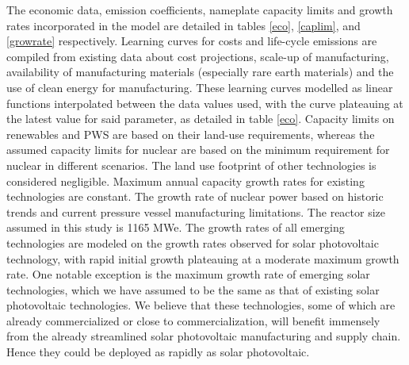 The economic data, emission coefficients, nameplate capacity limits and growth rates incorporated in the model are detailed in tables \ref{eco}, \ref{caplim}, and \ref{growrate} respectively. Learning curves for costs and life-cycle emissions are compiled from existing data about cost projections, scale-up of manufacturing, availability of manufacturing materials (especially rare earth materials) and the use of clean energy for manufacturing. These learning curves modelled as linear functions interpolated between the data values used, with the curve plateauing at the latest value for said parameter, as detailed in table \ref{eco}. Capacity limits on renewables and \gls{PWS} are based on their land-use requirements, whereas the assumed capacity limits for nuclear are based on the minimum requirement for nuclear in different scenarios. The land use footprint of other technologies is considered negligible. Maximum annual capacity growth rates for existing technologies are constant. The growth rate of nuclear power based on historic trends and current pressure vessel manufacturing limitations. The reactor size assumed in this study is 1165 MWe. The growth rates of all emerging technologies are modeled on the growth rates observed for solar photovoltaic technology, with rapid initial growth plateauing at a moderate maximum growth rate. One notable exception is the maximum growth rate of emerging solar technologies, which we have assumed to be the same as that of existing solar photovoltaic technologies. We believe that these technologies, some of which are already commercialized or close to commercialization,  will benefit immensely from the already streamlined solar photovoltaic manufacturing and supply chain. Hence they could be deployed as rapidly as solar photovoltaic. 



